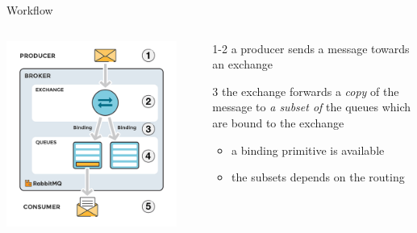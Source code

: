 \documentclass{beamer}\mode<presentation>{\usetheme{AMSBolognaFC}}
\begin{document}
\begin{frame}{Workflow}

    \begin{columns}
        \begin{column}{.5\linewidth}
            \includegraphics[width=\linewidth]{img/binding.png}
        \end{column}
        \begin{column}{.5\linewidth}
            \begin{itemize}
                \item[1-2] a \alert{producer} sends a message towards an \alert{exchange}

                \medskip

                \item[3] the exchange forwards a \emph{copy} of the message to \emph{a subset of} the queues which are \alert{bound} to the exchange
                \begin{itemize}
                    \item a \alert{binding} primitive is available
                    \item the subsets depends on the routing
                \end{itemize}


\end{itemize}
\end{column}
\end{columns}
\end{frame}
\end{document}
